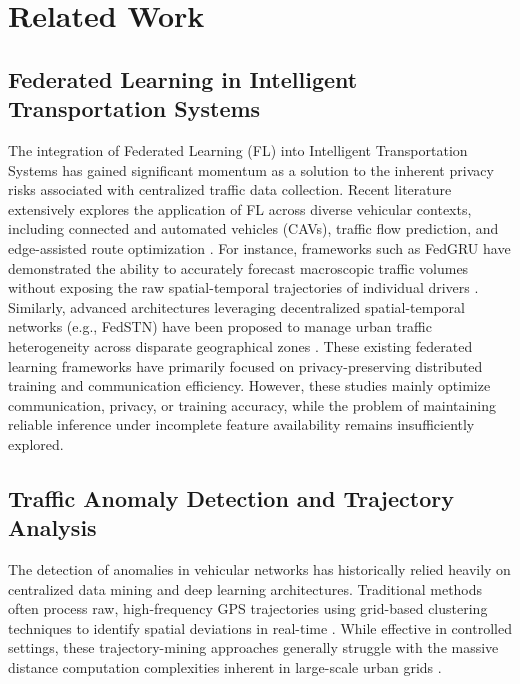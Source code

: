 \section{Related Work}

\subsection{Federated Learning in Intelligent Transportation Systems}

The integration of Federated Learning (FL) into Intelligent Transportation Systems has gained significant momentum as a solution to the inherent privacy risks associated with centralized traffic data collection. Recent literature extensively explores the application of FL across diverse vehicular contexts, including connected and automated vehicles (CAVs), traffic flow prediction, and edge-assisted route optimization \cite{chellapandi2024cav}. For instance, frameworks such as FedGRU have demonstrated the ability to accurately forecast macroscopic traffic volumes without exposing the raw spatial-temporal trajectories of individual drivers \cite{liu2020privacy}. Similarly, advanced architectures leveraging decentralized spatial-temporal networks (e.g., FedSTN) have been proposed to manage urban traffic heterogeneity across disparate geographical zones \cite{yuan2023urban, zhang2024federated_its}. These existing federated learning frameworks have primarily focused on privacy-preserving distributed training and communication efficiency. However, these studies mainly optimize communication, privacy, or training accuracy, while the problem of maintaining reliable inference under incomplete feature availability remains insufficiently explored.

\subsection{Traffic Anomaly Detection and Trajectory Analysis}

The detection of anomalies in vehicular networks has historically relied heavily on centralized data mining and deep learning architectures. Traditional methods often process raw, high-frequency GPS trajectories using grid-based clustering techniques to identify spatial deviations in real-time \cite{kong2018realtime}. While effective in controlled settings, these trajectory-mining approaches generally struggle with the massive distance computation complexities inherent in large-scale urban grids \cite{su2020trajectory}. 

